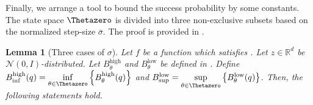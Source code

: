 \documentclass[journal]{IEEEtran}
\providecommand{\R}{\mathbb{R}} %
\renewcommand{\geq}{\geqslant} %
\newtheorem{lemma}[theorem]{Lemma}
\theoremstyle{definition}
\newcommand{\aup}{\alpha_{\uparrow}}
\newcommand{\adown}{\alpha_{\downarrow}}
\begin{document}
Finally, we arrange a tool to bound the success probability by some constants. The state space $\Thetazero$ is divided into three non-exclusive subsets based on the normalized step-size $\bar\sigma$.
The proof is provided in .
\begin{lemma}[Three cases of $\sigma$]\label{lemma:cases}
Let $f$ be a function which satisfies .
Let $z \in \R^d$ be $\mathcal{N}(0, I)$-distributed.
Let $B_\theta^\mathrm{high}$ and $B_\theta^\mathrm{low}$ be defined in .
Define $B_{\inf}^\mathrm{high}(q) = \underset{\theta\in\Thetazero}{\inf} \left\{ B_\theta^\mathrm{high}(q) \right\}$ and $B_{\sup}^\mathrm{low} = \underset{\theta\in\Thetazero}{\sup} \left\{ B_\theta^\mathrm{low}(q) \right\}$.
Then, the following statements hold.


\end{lemma}
\end{document}
